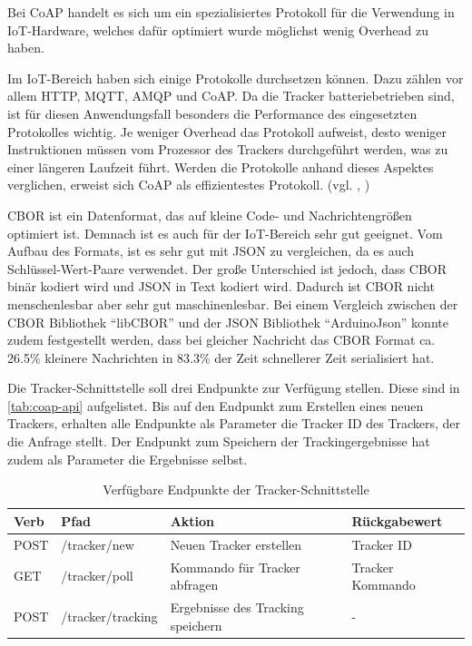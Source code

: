 Bei \gls{CoAP} handelt es sich um ein spezialisiertes Protokoll für die Verwendung in
\gls{IoT}-Hardware, welches dafür optimiert wurde möglichst wenig \gls{Overhead} zu haben.

Im \gls{IoT}-Bereich haben sich einige Protokolle durchsetzen können. Dazu zählen vor allem
\gls{HTTP}, \gls{MQTT}, \gls{AMQP} und \gls{CoAP}.
Da die Tracker batteriebetrieben sind, ist für diesen Anwendungsfall besonders die Performance des
eingesetzten Protokolles wichtig. Je weniger Overhead das Protokoll aufweist, desto weniger
Instruktionen müssen vom Prozessor des Trackers durchgeführt werden, was zu einer längeren Laufzeit
führt.
Werden die Protokolle anhand dieses Aspektes verglichen, erweist sich \gls{CoAP} als effizientestes
Protokoll. (vgl. \cite{Dizdarevic2019}, \cite{Naik2017})

\gls{CBOR} ist ein Datenformat, das auf kleine Code- und Nachrichtengrößen optimiert ist.
Demnach ist es auch für der \gls{IoT}-Bereich sehr gut geeignet.
Vom Aufbau des Formats, ist es sehr gut mit \gls{JSON} zu vergleichen, da es auch Schlüssel-Wert-Paare verwendet.
Der große Unterschied ist jedoch, dass \gls{CBOR} binär kodiert wird und \gls{JSON} in Text kodiert wird.
Dadurch ist \gls{CBOR} nicht menschenlesbar aber sehr gut maschinenlesbar.
Bei einem Vergleich zwischen der \gls{CBOR} Bibliothek \enquote{libCBOR} und der \gls{JSON} Bibliothek \enquote{ArduinoJson}
konnte zudem festgestellt werden, dass bei gleicher Nachricht das \gls{CBOR} Format ca. 26.5\% kleinere Nachrichten
in 83.3\% der Zeit schnellerer Zeit serialisiert hat.


Die Tracker-Schnittstelle soll drei Endpunkte zur Verfügung stellen.
Diese sind in \autoref{tab:coap-api} aufgelistet.
Bis auf den Endpunkt zum Erstellen eines neuen Trackers, erhalten alle Endpunkte als Parameter die Tracker ID des Trackers, der die Anfrage stellt.
Der Endpunkt zum Speichern der Trackingergebnisse hat zudem als Parameter die Ergebnisse selbst.

\begin{table}[]
\begin{tabular}{l l l l}
\textbf{Verb} & \textbf{Pfad}     & \textbf{Aktion}                   & \textbf{Rückgabewert}    \\ \hline
POST          & /tracker/new      & Neuen Tracker erstellen           & Tracker ID \\ \hline
GET           & /tracker/poll     & Kommando für Tracker abfragen     & Tracker Kommando   \\ \hline
POST          & /tracker/tracking & Ergebnisse des Tracking speichern & -
\end{tabular}
\caption{\label{tab:coap-api}Verfügbare Endpunkte der Tracker-Schnittstelle}
\end{table}


